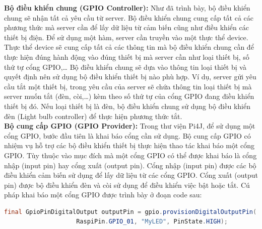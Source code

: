 \documentclass[12pt,a4paper,oneside]{extbook}
\begin{document}
\noindent
\textbf{Bộ điều khiển chung (GPIO Controller):} Như đã trình bày, bộ điều khiển chung sẽ nhận tất cả yêu cầu từ server. Bộ điều khiển chung cung cấp tất cả các phương thức mà server cần để lấy dữ liệu từ cảm biến cũng như điều khiển các thiết bị điện. Để sử dụng một hàm, server cần truyền vào một thực thể device. Thực thể device sẽ cung cấp tất cả các thông tin mà bộ điều khiển chung cần để thực hiện đúng hành động vào đúng thiết bị mà server cần như loại thiết bị, số thứ tự cổng GPIO,\dots\hspace{0mm} Bộ điều khiển chung sẽ dựa vào thông tin loại thiết bị và quyết định nên sử dụng bộ điều khiển thiết bị nào phù hợp. Ví dụ, server gửi yêu cầu tắt một thiết bị, trong yêu cầu của server sẽ chứa thông tin loại thiết bị mà server muốn tắt (đèn, còi,\dots) kèm theo số thứ tự của cổng GPIO đang điều khiển thiết bị đó. Nếu loại thiết bị là đèn, bộ điều khiển chung sử dụng bộ điều khiển đèn (Light bulb controller) để thực hiện phương thức tắt.\\

\noindent
\textbf{Bộ cung cấp GPIO (GPIO Provider):} Trong thư viện Pi4J, để sử dụng một cổng GPIO, bước đầu tiên là khai báo cổng cần sử dụng. Bộ cung cấp GPIO có nhiệm vụ hỗ trợ các bộ điều khiển thiết bị thực hiện thao tác khai báo một cổng GPIO. Tùy thuộc vào mục đích mà một cổng GPIO có thể được khai báo là cổng nhập (input pin) hay cổng xuất (output pin). Cổng nhập (input pin) được các bộ điều khiển cảm biến sử dụng để lấy dữ liệu từ các cổng GPIO. Cổng xuất (output pin) được bộ điều khiển đèn và còi sử dụng để điều khiển việc bật hoặc tắt. Cú pháp khai báo một cổng GPIO được trình bày ở đoạn code sau:

\begin{lstlisting}[language=Java, label={lst:declare-gpio}]
	final GpioPinDigitalOutput outputPin = gpio.provisionDigitalOutputPin(
					RaspiPin.GPIO_01, "MyLED", PinState.HIGH);
\end{lstlisting}
\end{document}
